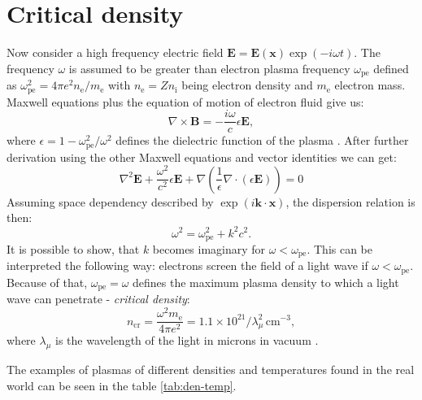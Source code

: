 \section{Critical density}
Now consider a high frequency electric field $\bm{E} = \bm{E(x)}\exp\left(-i\omega t\right)$. The frequency $\omega$ is assumed to be greater than electron plasma frequency $\omega_{\mathrm{pe}}$ defined as $\omega_{\mathrm{pe}}^2=4\pi e^2 n_\mathrm{e}/m_\mathrm{e}$ with $n_\mathrm{e}=Zn_{\mathrm{i}}$ being electron density and $m_\mathrm{e}$ electron mass. Maxwell equations plus the equation of motion of electron fluid give us:
\begin{equation}
	\nabla \times \bm{B} = -\frac{i\omega}{c}\epsilon\bm{E},
\end{equation}
where $\epsilon = 1 - \omega_{\mathrm{pe}}^2/\omega^2$ defines the dielectric function of the plasma \cite{laser-plasma4}. After further derivation using the other Maxwell equations and vector identities we can get:
\begin{equation}
	\nabla^2 \bm{E} + \frac{\omega^2}{c^2}\epsilon\bm{E} + \nabla\left(\frac{1}{\epsilon}\nabla \cdot \left(\epsilon\bm{E}\right)\right) = 0
\end{equation}
Assuming space dependency described by $\exp\left(i\bm{k}\cdot\bm{x}\right)$, the dispersion relation is then:
\begin{equation}
	\omega^2 = \omega_{\mathrm{pe}}^2 + k^2c^2.
\end{equation}
It is possible to show, that $k$ becomes imaginary for $\omega < \omega_{\mathrm{pe}}$. This can be interpreted the following way: electrons screen the field of a light wave if $\omega < \omega_{\mathrm{pe}}$. Because of that, $\omega_{\mathrm{pe}}=\omega$ defines the maximum plasma density to which a light wave can penetrate - \textit{critical density}:
\begin{equation}
	n_{\mathrm{cr}} = \frac{\omega^2 m_\mathrm{e}}{4 \pi e^2} = 1.1 \times 10^{21} / \lambda_\mu^2 \, \mathrm{cm}^{-3}, 
\end{equation}
where  $\lambda_\mu$ is the wavelength of the light in microns in vacuum \cite{laser-plasma4}.

The examples of plasmas of different densities and temperatures found in the real world can be seen in the table \ref{tab:den-temp}.

